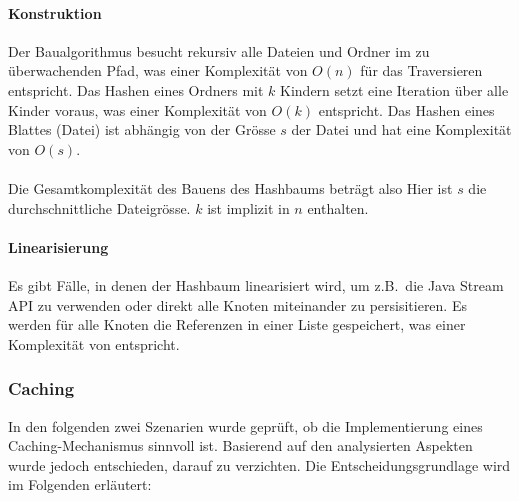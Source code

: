 \documentclass[a4paper,12pt]{report}
\begin{document}
    \paragraph*{Konstruktion}

    Der Baualgorithmus besucht rekursiv alle Dateien und Ordner im zu überwachenden Pfad,
    was einer Komplexität von $O(n)$ für das Traversieren entspricht.
    Das Hashen eines Ordners mit $k$ Kindern setzt eine Iteration über alle Kinder voraus, was einer Komplexität von $O(k)$ entspricht.
    Das Hashen eines Blattes (Datei) ist abhängig von der Grösse $s$ der Datei und hat eine Komplexität von $O(s)$.
    \\\\
    Die Gesamtkomplexität des Bauens des Hashbaums beträgt also 
    Hier ist $s$ die durchschnittliche Dateigrösse. $k$ ist implizit in $n$ enthalten.

    \paragraph*{Linearisierung}

    Es gibt Fälle, in denen der Hashbaum linearisiert wird, um z.B.\ die Java Stream API zu verwenden oder direkt alle Knoten miteinander zu persisitieren.
    Es werden für alle Knoten die Referenzen in einer Liste gespeichert, was einer Komplexität von   entspricht.

    \subsubsection{Caching}

    In den folgenden zwei Szenarien wurde geprüft, ob die Implementierung eines Caching-Mechanismus sinnvoll ist.
    Basierend auf den analysierten Aspekten wurde jedoch entschieden, darauf zu verzichten.
    Die Entscheidungsgrundlage wird im Folgenden erläutert:
\end{document}
